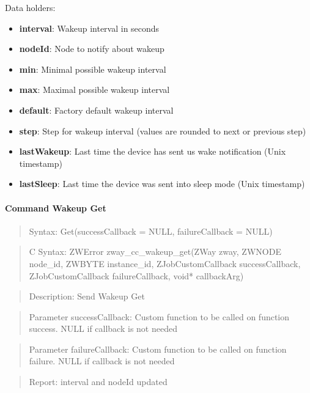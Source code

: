\noindent
Data holders:

\begin{itemize}
\item \textbf{interval}: Wakeup interval in seconds
\item \textbf{nodeId}: Node to notify about wakeup
\item \textbf{min}: Minimal possible wakeup interval
\item \textbf{max}: Maximal possible wakeup interval
\item \textbf{default}: Factory default wakeup interval
\item \textbf{step}: Step for wakeup interval (values are rounded to next or previous step)
\item \textbf{lastWakeup}: Last time the device has sent us wake notification (Unix timestamp)
\item \textbf{lastSleep}: Last time the device was sent into sleep mode (Unix timestamp)
\end{itemize}

\paragraph{Command Wakeup Get}
\begin{quote}Syntax: Get(successCallback = NULL, failureCallback = NULL)\end{quote}
\begin{quote}C Syntax: ZWError zway\_cc\_wakeup\_get(ZWay zway, ZWNODE node\_id, ZWBYTE instance\_id, ZJobCustomCallback successCallback, ZJobCustomCallback failureCallback, void* callbackArg)\end{quote}
\begin{quote}Description: Send Wakeup Get\end{quote}
\begin{quote}Parameter successCallback: Custom function to be called on function success. NULL if callback is not needed\end{quote}
\begin{quote}Parameter failureCallback: Custom function to be called on function failure. NULL if callback is not needed\end{quote}
\begin{quote}Report: interval and nodeId updated\end{quote}

